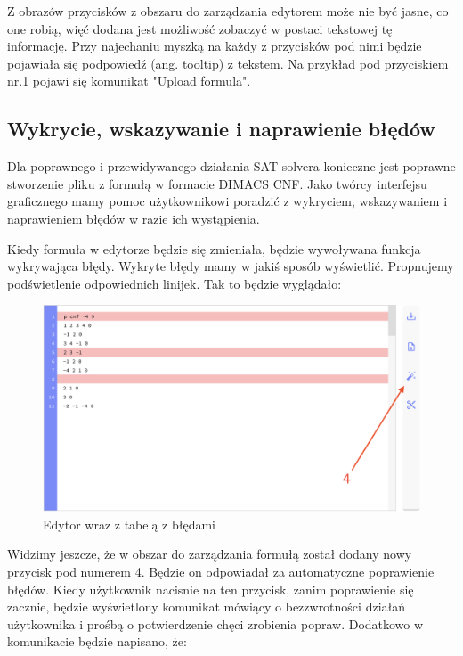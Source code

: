 \documentclass[a4paper,12pt,oneside]{book}
\theoremstyle{definition}
\begin{document}
Z obrazów przycisków z obszaru do zarządzania edytorem może nie być jasne, co one robią, więć dodana jest możliwość zobaczyć w postaci tekstowej tę informację. Przy najechaniu myszką na każdy z przycisków pod nimi będzie pojawiała się podpowiedź (ang. tooltip) z tekstem. Na przykład pod przyciskiem nr.1 pojawi się komunikat "Upload formula".

\newpage

\subsection{Wykrycie, wskazywanie i naprawienie błędów}

Dla poprawnego i przewidywanego działania SAT-solvera konieczne jest poprawne stworzenie pliku z formułą w formacie DIMACS CNF. Jako twórcy interfejsu graficznego mamy pomoc użytkownikowi poradzić z wykryciem, wskazywaniem i naprawieniem błędów w razie ich wystąpienia. 

Kiedy formuła w edytorze będzie się zmieniała, będzie wywoływana funkcja wykrywająca błędy. Wykryte błędy mamy w jakiś sposób wyświetlić. Propnujemy podświetlenie odpowiednich linijek. Tak to będzie wyglądało: 

\begin{figure}[ht]
    \centering
    \includegraphics[width=14.30cm]{4}
    \caption{Edytor wraz z tabelą z błędami}
    \label{fig:4}
\end{figure}

\noindent Widzimy jeszcze, że w obszar do zarządzania formułą został dodany nowy przycisk pod numerem 4. Będzie on odpowiadał za automatyczne poprawienie błędów. Kiedy użytkownik nacisnie na ten przycisk, zanim poprawienie się zacznie, będzie wyświetlony komunikat mówiący o bezzwrotności działań użytkownika i prośbą o potwierdzenie chęci zrobienia popraw. Dodatkowo w komunikacie będzie napisano, że: 
\end{document}
